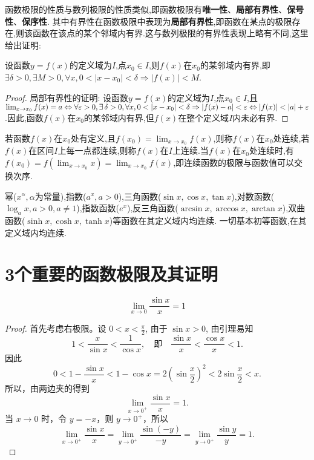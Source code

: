 函数极限的性质与数列极限的性质类似,即函数极限有\textbf{唯一性}、\textbf{局部有界性}、\textbf{保号性}、\textbf{保序性}.
其中有界性在函数极限中表现为\textbf{局部有界性},即函数在某点的极限存在,则该函数在该点的某个邻域内有界.这与数列极限的有界性表现上略有不同,这里给出证明:
\begin{theorem}[函数极限的局部有界性]
    设函数$y=f(x)$的定义域为$I$,点$x_0 \in I$,则$f(x)$在$x_0$的某邻域内有界,即$\exists \delta >0, \exists M >0, \forall x, 0<|x-x_0|<\delta \Rightarrow |f(x)|<M$.
\end{theorem}
\begin{proof}
    局部有界性的证明:
    设函数$y=f(x)$的定义域为$I$,点$x_0 \in I$,且$\lim _{x \to x_0} f(x) = a \Leftrightarrow \forall \ve >0, \exists \delta >0, \forall x, 0<|x-x_0|<\delta \Rightarrow |f(x)-a|<\ve \Leftrightarrow |f(x)|<|a|+\ve$.因此,函数$f(x)$在$x_0$的某邻域内有界,但$f(x)$在整个定义域$I$内未必有界.
\end{proof}

若函数$f(x)$在$x_0$处有定义,且$f(x_0) = \lim _{x \to x_0} f(x)$,则称$f(x)$在$x_0$处连续,若$f(x)$在区间$I$上每一点都连续,则称$f(x)$在$I$上连续.当$f(x)$在$x_0$处连续时,有$f(x_0) = f\left(\lim _{x \to x_0} x\right) = \lim _{x \to x_0} f(x)$,即连续函数的极限与函数值可以交换次序.

幂($x^\alpha, \alpha$为常量),指数($a^x, a>0$),三角函数($\sin x, \cos x, \tan x$),对数函数($\log_a x, a>0, a \neq 1$),指数函数($e^x$),反三角函数($\arcsin x, \arccos x, \arctan x$),双曲函数($\sinh x, \cosh x, \tanh x$)等函数在其定义域内均连续.
一切基本初等函数,在其定义域内均连续.

\section{3个重要的函数极限及其证明}

\begin{proposition}
    $$\lim _{x \to 0} \dfrac{\sin x}{x} = 1$$
\end{proposition}

\begin{proof}
    首先考虑右极限。设 $0 < x < \frac{\pi}{2}$, 由于 $\sin x > 0$, 由引理易知
    $$
        1 < \frac{x}{\sin x} < \frac{1}{\cos x}, \quad \text{即} \quad \frac{\sin x}{x} < \frac{\cos x}{x} < 1.
    $$
    因此
    $$
        0 < 1 - \frac{\sin x}{x} < 1 - \cos x = 2 \left( \sin \frac{x}{2} \right)^2 < 2 \sin \frac{x}{2} < x.
    $$
    所以，由两边夹的得到
    $$
        \lim_{x \to 0^+} \frac{\sin x}{x} = 1.
    $$
    当 $x \to 0$ 时，令 $y = -x$，则 $y \to 0^+$，所以
    $$
        \lim_{x \to 0^+} \frac{\sin x}{x} = \lim_{y \to 0^+} \frac{\sin(-y)}{-y} = \lim_{y \to 0^+} \frac{\sin y}{y} = 1.
    $$
\end{proof}

